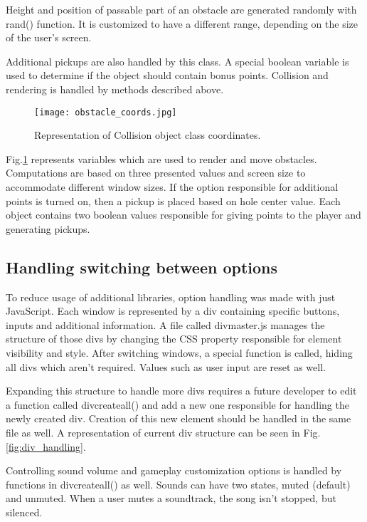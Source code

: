 \documentclass[oneside,a4paper,11pt]{report}
\begin{document}
\par
Height and position of passable part of an obstacle are generated randomly with rand() function. It is customized to have a different range, depending on the size of the user's screen.

\par
Additional pickups are also handled by this class. A special boolean variable is used to determine if the object should contain bonus points. Collision and rendering is handled by methods described above.

\begin{figure}
	\centering
	\texttt{[image: obstacle\_coords.jpg]}
	\caption{Representation of Collision object class coordinates.\label{fig:collision}}
\end{figure}

\par
Fig.\ref{fig:collision} represents variables which are used to render and move obstacles. Computations are based on three presented values and screen size to accommodate different window sizes. If the option responsible for additional points is turned on, then a pickup is placed based on hole center value. Each object contains two boolean values responsible for giving points to the player and generating pickups.

\subsection{Handling switching between options}
To reduce usage of additional libraries, option handling was made with just JavaScript. Each window is represented by a div containing specific buttons, inputs and additional information. A file called div\textunderscore master.js manages the structure of those divs by changing the CSS property responsible for element visibility and style. After switching windows, a special function is called, hiding all divs which aren't required. Values such as user input are reset as well.

\par
Expanding this structure to handle more divs requires a future developer to edit a function called div\textunderscore create\textunderscore all() and add a new one responsible for handling the newly created div. Creation of this new element should be handled in the same file as well. A representation of current div structure can be seen in Fig.\ref{fig:div_handling}.

\par
Controlling sound volume and gameplay customization options is handled by functions in div\textunderscore create\textunderscore all() as well. Sounds can have two states, muted (default) and unmuted. When a user mutes a soundtrack, the song isn't stopped, but silenced.
\end{document}

